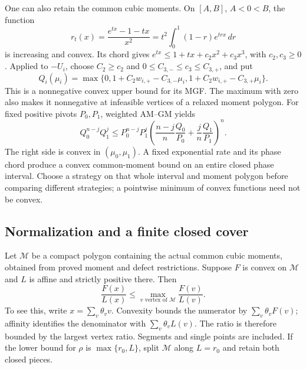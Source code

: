One can also retain the common cubic moments. On $[A,B]$, $A<0<B$,
the function
\[
 r_t(x)=\frac{e^{tx}-1-tx}{x^2}
       =t^2\int_0^1(1-r)e^{trx}\,dr
\]
is increasing and convex. Its chord gives
$e^{tx}\le1+tx+c_2x^2+c_3x^3$, with $c_2,c_3\ge0$.
Applied to $-U_i$, choose $C_2\ge c_2$ and
$0\le C_{3,-}\le c_3\le C_{3,+}$, and put
\[
 Q_i(\mu_i)=\max\{0,1+C_2w_{i,+}-C_{3,-}\mu_i,
                     1+C_2w_{i,+}-C_{3,+}\mu_i\}.
\]
This is a nonnegative convex upper bound for its MGF. The maximum with zero
also makes it nonnegative at infeasible vertices of a relaxed moment polygon.
For fixed positive pivots $P_0,P_1$, weighted AM--GM yields
\[
 Q_0^{n-j}Q_1^j\le P_0^{n-j}P_1^j
 \left(\frac{n-j}{n}\frac{Q_0}{P_0}
       +\frac{j}{n}\frac{Q_1}{P_1}\right)^n.
\]
The right side is convex in $(\mu_0,\mu_1)$. A fixed exponential rate
and its phase chord produce a convex common-moment bound on an entire
closed phase interval. Choose a strategy on that whole interval and
moment polygon before comparing different strategies; a pointwise
minimum of convex functions need not be convex.

\subsection{Normalization and a finite closed cover}
Let $\mathcal M$ be a compact polygon containing the actual common
cubic moments, obtained from proved moment and defect restrictions.
Suppose $F$ is convex on $\mathcal M$ and $L$ is affine and strictly
positive there. Then
\begin{equation}\label{ext:normalized-vertex}
 \frac{F(x)}{L(x)}\le
 \max_{v\text{ vertex of }\mathcal M}\frac{F(v)}{L(v)}.
\end{equation}
To see this, write $x=\sum_v\theta_vv$. Convexity bounds the numerator
by $\sum_v\theta_vF(v)$; affinity identifies the denominator with
$\sum_v\theta_vL(v)$. The ratio is therefore bounded by the largest
vertex ratio. Segments and single points are included. If the lower
bound for $\rho$ is $\max\{r_0,L\}$, split $\mathcal M$ along
$L=r_0$ and retain both closed pieces.

